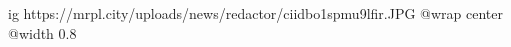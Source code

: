  
 
 
 
 

\ifcmt
  ig https://mrpl.city/uploads/news/redactor/ciidbo1spmu9lfir.JPG
  @wrap center
  @width 0.8
\fi
